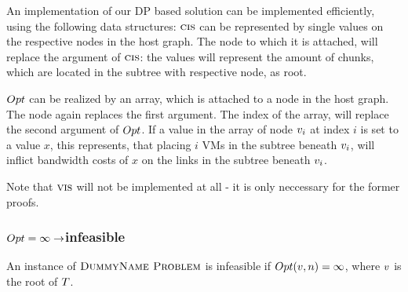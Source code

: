 
An implementation of our DP based solution can be implemented efficiently, 
using the following data structures: $\textsc{cis}$ can be 
represented by single values on the respective nodes in the host graph. The 
node to which it is attached, will replace the argument of $\textsc{cis}$: the 
values will represent the amount of chunks, which are located in the subtree 
with respective node, as root.

$Opt$ can be realized by an array, which is attached to a node in the host 
graph. The node again replaces the first argument. The index of the array, will 
replace the second argument of $Opt$. If a value in the array of node 
$v_i$ at index $i$ is set to a value $x$, this represents, that 
placing $i$ VMs in the subtree beneath $v_i$, will inflict 
bandwidth costs of $x$ on the links in the subtree beneath $v_i$.

Note that $\textsc{vis}$ will not be implemented at all - it is only neccessary for 
the former proofs.

\subsubsection{$Opt = \infty \rightarrow $infeasible}


\begin{lemma}
An instance of $\textsc{DummyName Problem}$ is infeasible if $Opt(v,n) = \infty$, 
where $v$ is the root of $T$.
\end{lemma}

